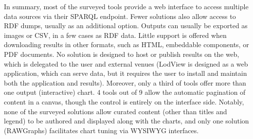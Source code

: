 \documentclass[manuscript]
{acmart}
\begin{document}
\begin{table}[ht]
\centering
\small
  \caption{A summary of the results of the analysis}
  \label{tab:results}
\end{table}

In summary, most of the surveyed tools provide a web interface to access multiple data sources via their SPARQL endpoint. Fewer solutions also allow access to RDF dumps, usually as an additional option.
Outputs can usually be exported as images or CSV, in a few cases as RDF data. Little support is offered when downloading results in other formats, such as HTML, embeddable components, or PDF documents. No solution is designed to host or publish results on the web, which is delegated to the user and external venues (LodView is designed as a web application, which can serve data, but it requires the user to install and maintain both the application and results).
Moreover, only a third of tools offer more than one output (interactive) chart. 4 tools out of 9 allow the automatic pagination of content in a canvas, though the control is entirely on the interface side. Notably, none of the surveyed solutions allow curated content (other than titles and legend) to be authored and displayed along with the charts, and only one solution (RAWGraphs) facilitates chart tuning via WYSIWYG interfaces.
\end{document}
